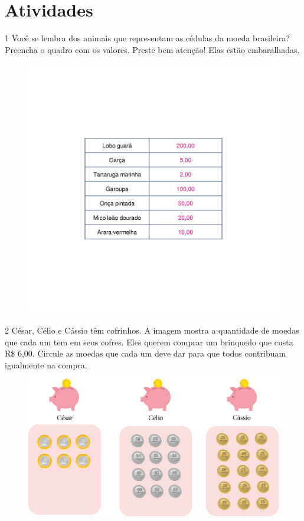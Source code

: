 \section*{Atividades}

\num{1} Você se lembra dos animais que representam as cédulas da moeda
brasileira? Preencha o quadro com os valores. Preste bem atenção!
Elas estão embaralhadas.

\begin{figure}[htpb!]
\centering
\includegraphics[width=.7\textwidth]{./media/image63_prof.png}
\end{figure}


\pagebreak

\num{2} César, Célio e Cássio têm cofrinhos. A
imagem mostra a quantidade de moedas que cada um tem em
seus cofres. Eles querem comprar um brinquedo que custa R\$ 6,00.
Circule as moedas que cada um deve dar para que todos contribuam
igualmente na compra.

\begin{figure}[htpb!]
\centering
\includegraphics[width=.8\textwidth]{./media/image76.png}
\end{figure}

